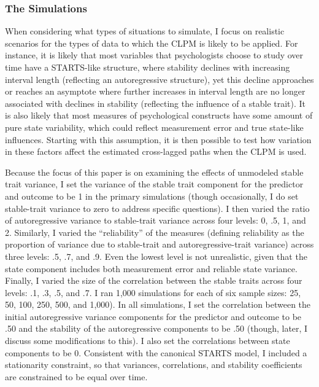 \documentclass[
  english,
  man,floatsintext]{apa6}
\begin{document}
\hypertarget{the-simulations}{%
\subsubsection{The Simulations}\label{the-simulations}}

When considering what types of situations to simulate, I focus on realistic scenarios for the types of data to which the CLPM is likely to be applied. For instance, it is likely that most variables that psychologists choose to study over time have a STARTS-like structure, where stability declines with increasing interval length (reflecting an autoregressive structure), yet this decline approaches or reaches an asymptote where further increases in interval length are no longer associated with declines in stability (reflecting the influence of a stable trait). It is also likely that most measures of psychological constructs have some amount of pure state variability, which could reflect measurement error and true state-like influences. Starting with this assumption, it is then possible to test how variation in these factors affect the estimated cross-lagged paths when the CLPM is used.

Because the focus of this paper is on examining the effects of unmodeled stable trait variance, I set the variance of the stable trait component for the predictor and outcome to be 1 in the primary simulations (though occasionally, I do set stable-trait variance to zero to address specific questions). I then varied the ratio of autoregressive variance to stable-trait variance across four levels: 0, .5, 1, and 2. Similarly, I varied the ``reliability'' of the measures (defining reliability as the proportion of variance due to stable-trait and autoregressive-trait variance) across three levels: .5, .7, and .9. Even the lowest level is not unrealistic, given that the state component includes both measurement error and reliable state variance. Finally, I varied the size of the correlation between the stable traits across four levels: .1, .3, .5, and .7. I ran 1,000 simulations for each of six sample sizes: 25, 50, 100, 250, 500, and 1,000). In all simulations, I set the correlation between the initial autoregressive variance components for the predictor and outcome to be .50 and the stability of the autoregressive components to be .50 (though, later, I discuss some modifications to this). I also set the correlations between state components to be 0. Consistent with the canonical STARTS model, I included a stationarity constraint, so that variances, correlations, and stability coefficients are constrained to be equal over time.
\end{document}
